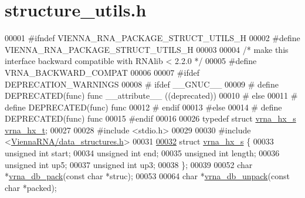 \hypertarget{structure__utils_8h_source}{}\section{structure\+\_\+utils.\+h}
\label{structure__utils_8h_source}

\begin{DoxyCode}
00001 \textcolor{preprocessor}{#ifndef VIENNA\_RNA\_PACKAGE\_STRUCT\_UTILS\_H}
00002 \textcolor{preprocessor}{#define VIENNA\_RNA\_PACKAGE\_STRUCT\_UTILS\_H}
00003 
00004 \textcolor{comment}{/* make this interface backward compatible with RNAlib < 2.2.0 */}
00005 \textcolor{preprocessor}{#define VRNA\_BACKWARD\_COMPAT}
00006 
00007 \textcolor{preprocessor}{#ifdef DEPRECATION\_WARNINGS}
00008 \textcolor{preprocessor}{# ifdef \_\_GNUC\_\_}
00009 \textcolor{preprocessor}{#  define DEPRECATED(func) func \_\_attribute\_\_ ((deprecated))}
00010 \textcolor{preprocessor}{# else}
00011 \textcolor{preprocessor}{#  define DEPRECATED(func) func}
00012 \textcolor{preprocessor}{# endif}
00013 \textcolor{preprocessor}{#else}
00014 \textcolor{preprocessor}{# define DEPRECATED(func) func}
00015 \textcolor{preprocessor}{#endif}
00016 
00026 \textcolor{keyword}{typedef} \textcolor{keyword}{struct }\hyperlink{group__struct__utils_structvrna__hx__s}{vrna\_hx\_s}  \hyperlink{group__struct__utils_structvrna__hx__s}{vrna\_hx\_t};
00027 
00028 \textcolor{preprocessor}{#include <stdio.h>}
00029 
00030 \textcolor{preprocessor}{#include <\hyperlink{data__structures_8h}{ViennaRNA/data\_structures.h}>}
00031 
\hypertarget{structure__utils_8h_source_l00032}{}\hyperlink{group__struct__utils}{00032} \textcolor{keyword}{struct }\hyperlink{group__struct__utils_structvrna__hx__s}{vrna\_hx\_s} \{
00033   \textcolor{keywordtype}{unsigned} \textcolor{keywordtype}{int} start;
00034   \textcolor{keywordtype}{unsigned} \textcolor{keywordtype}{int} end;
00035   \textcolor{keywordtype}{unsigned} \textcolor{keywordtype}{int} length;
00036   \textcolor{keywordtype}{unsigned} \textcolor{keywordtype}{int} up5;
00037   \textcolor{keywordtype}{unsigned} \textcolor{keywordtype}{int} up3;
00038 \};
00039 
00052 \textcolor{keywordtype}{char} *\hyperlink{group__struct__utils_ga55c4783060a1464f862f858d5599c9e1}{vrna\_db\_pack}(\textcolor{keyword}{const} \textcolor{keywordtype}{char} *struc);
00053 
00064 \textcolor{keywordtype}{char} *\hyperlink{group__struct__utils_ga6490adff857d84ce06e6f379ae3a4512}{vrna\_db\_unpack}(\textcolor{keyword}{const} \textcolor{keywordtype}{char} *packed);

\end{DoxyCode}
